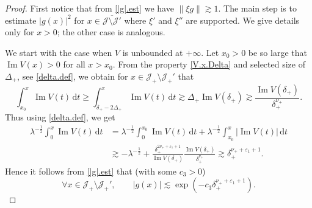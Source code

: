 \begin{proof}
First notice that from \eqref{|g|.est} we have $\|\xi g\| {\gtrsim} 1$. The main step is to estimate $|g(x)|^2$ for 
$x \in \overline{{\mathcal J} \setminus {\mathcal J}'}$ where $\xi'$ and $\xi''$ are supported.
We give details only for $x>0$; the other case is analogous.

We start with the case when $V$ is unbounded at $+\infty$. Let $x_0>0$ be so large that ${\operatorname{Im}} V(x) >0$ for all $x > x_0$. From the property \eqref{V.x.Delta} and selected size of $\Delta_+$, see \eqref{delta.def},  we obtain for $x \in {\mathcal J}_+ \setminus {\mathcal J}_+'$ that
\begin{equation}
\int_{x_0}^{x} {\operatorname{Im}} V(t) \, {\mathrm{d}} t 
 \geq  
\int_{\delta_+-2\Delta_+}^{x} {\operatorname{Im}} V(t) \, {\mathrm{d}} t
{\gtrsim}
\Delta_+ {\operatorname{Im}} V(\delta_+)  
{\gtrsim} 
\frac{{\operatorname{Im}} V(\delta_+)}{\delta_+^{\nu_+}} .  
\end{equation}
Thus using \eqref{delta.def}, we get
\begin{equation}
\begin{aligned}
\lambda^{-\frac 12}\int_0^x {\operatorname{Im}} V(t) \, {\mathrm{d}} t 
&=
\lambda^{-\frac 12}\int_0^{x_0} {\operatorname{Im}} V(t) \, {\mathrm{d}} t  + \lambda^{-\frac 12}\int_{x_0}^{x} |{\operatorname{Im}} V(t)| \, {\mathrm{d}} t 
\\
& {\gtrsim} 
-\lambda^{-\frac 12}+
\frac{\delta_+^{2\nu_+ +{\varepsilon}_1+1}}{{\operatorname{Im}} V(\delta_+)} \frac{{\operatorname{Im}} V(\delta_+)}{\delta_+^{\nu_+}}
{\gtrsim} \delta_+^{\nu_+ +{\varepsilon}_1+1}.
\end{aligned}
\end{equation}
Hence it follows from \eqref{|g|.est} that (with some $c_3>0$)
\begin{equation}
\forall x \in {\mathcal J}_+ \setminus {\mathcal J}_+', \qquad 
|g(x)| {\lesssim} \exp(- c_3 \delta_+^{\nu_+ + {\varepsilon}_1+1}).
\end{equation}


\end{proof}
